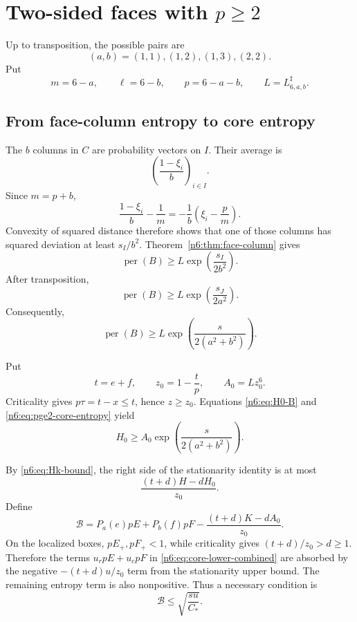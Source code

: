 \documentclass[11pt]{article}
\numberwithin{equation}{section}
\theoremstyle{definition}
\newcommand{\per}{\operatorname{per}}
\begin{document}
\section{Two-sided faces with \texorpdfstring{$p\ge2$}{p >= 2}}\label{n6:sec:pge2}

Up to transposition, the possible pairs are
\begin{equation}
 (a,b)=(1,1),(1,2),(1,3),(2,2).\label{n6:eq:pge2-pairs}
\end{equation}
Put
\[
 m=6-a,
 \qquad \ell=6-b,
 \qquad p=6-a-b,
 \qquad L=L^{\sharp}_{6,a,b}.
\]

\subsection{From face-column entropy to core entropy}

The $b$ columns in $C$ are probability vectors on $I$.  Their average is
\[
 \left(\frac{1-\xi_i}{b}\right)_{i\in I}.
\]
Since $m=p+b$,
\[
 \frac{1-\xi_i}{b}-\frac1m
 =-\frac1b\left(\xi_i-\frac pm\right).
\]
Convexity of squared distance therefore shows that one of those columns has
squared deviation at least $s_I/b^2$.  Theorem~\ref{n6:thm:face-column} gives
\[
 \per(B)\ge L\exp\left(\frac{s_I}{2b^2}\right).
\]
After transposition,
\[
 \per(B)\ge L\exp\left(\frac{s_J}{2a^2}\right).
\]
Consequently,
\begin{equation}
 \per(B)
 \ge L\exp\left(\frac{s}{2(a^2+b^2)}\right).\label{n6:eq:pge2-core-entropy}
\end{equation}

Put
\begin{equation}
 t=e+f,
 \qquad
 z_0=1-\frac tp,
 \qquad
 A_0=Lz_0^6.\label{n6:eq:pge2-A0}
\end{equation}
Criticality gives $p\tau=t-x\le t$, hence $z\ge z_0$.  Equations
\eqref{n6:eq:H0-B} and \eqref{n6:eq:pge2-core-entropy} yield
\begin{equation}
 H_0\ge A_0
 \exp\left(\frac{s}{2(a^2+b^2)}\right).\label{n6:eq:pge2-H0}
\end{equation}

By \eqref{n6:eq:Hk-bound}, the right side of the stationarity identity is at
most
\[
 \frac{(t+d)H-dH_0}{z_0}.
\]
Define
\begin{equation}
 \mathcal B
 =P_a(e)pE+P_b(f)pF
 -\frac{(t+d)K-dA_0}{z_0}.\label{n6:eq:pge2-B}
\end{equation}
On the localized boxes, $pE_+,pF_+<1$, while criticality gives
$(t+d)/z_0>d\ge1$.  Therefore the terms $u_rpE+u_cpF$ in
\eqref{n6:eq:core-lower-combined} are absorbed by the negative
$-(t+d)u/z_0$ term from the stationarity upper bound.  The remaining entropy
term is also nonpositive.  Thus a necessary condition is
\begin{equation}
 \mathcal B\le\sqrt{\frac{su}{C_*}}.\label{n6:eq:pge2-B-energy}
\end{equation}
\end{document}
